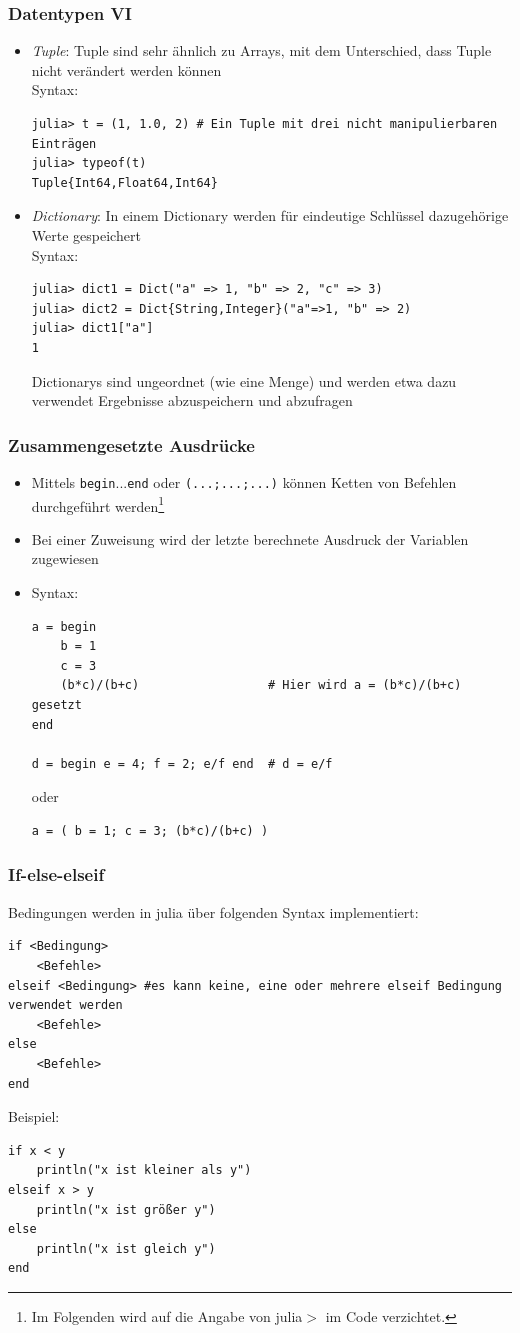 \begin{frame}[fragile]
\frametitle{Datentypen VI}
\begin{itemize}[<+->]
\item \textit{Tuple}: Tuple sind sehr ähnlich zu Arrays, mit dem Unterschied, dass Tuple nicht verändert werden können\\Syntax:
\begin{verbatim}
julia> t = (1, 1.0, 2) # Ein Tuple mit drei nicht manipulierbaren Einträgen
julia> typeof(t)
Tuple{Int64,Float64,Int64}
\end{verbatim}
\item \textit{Dictionary}: In einem Dictionary werden für eindeutige Schlüssel dazugehörige Werte gespeichert\\Syntax:
\begin{verbatim}
julia> dict1 = Dict("a" => 1, "b" => 2, "c" => 3)      
julia> dict2 = Dict{String,Integer}("a"=>1, "b" => 2)  
julia> dict1["a"]                                     
1
\end{verbatim}
Dictionarys sind ungeordnet (wie eine Menge) und werden etwa dazu verwendet Ergebnisse abzuspeichern und abzufragen
\end{itemize}
\end{frame}
\begin{frame}[fragile]
\frametitle{Zusammengesetzte Ausdrücke}
\begin{itemize}[<+->]
\item Mittels \verb+begin+...\verb+end+ oder \verb+(...;...;...)+ können Ketten von Befehlen durchgeführt werden\footnote{Im Folgenden wird auf die Angabe von \glqq julia$>$\grqq{} im Code verzichtet.}
\item Bei einer Zuweisung wird der letzte berechnete Ausdruck der Variablen zugewiesen
\item Syntax:
\begin{verbatim}
a = begin
    b = 1
    c = 3
    (b*c)/(b+c)                  # Hier wird a = (b*c)/(b+c) gesetzt
end

d = begin e = 4; f = 2; e/f end  # d = e/f
\end{verbatim}
oder
\begin{verbatim}
a = ( b = 1; c = 3; (b*c)/(b+c) )
\end{verbatim}
\end{itemize}
\end{frame}
\begin{frame}[fragile]
\frametitle{If-else-elseif}
Bedingungen werden in julia über folgenden Syntax implementiert:
\begin{verbatim}
if <Bedingung>
    <Befehle>
elseif <Bedingung> #es kann keine, eine oder mehrere elseif Bedingung verwendet werden
    <Befehle>
else
    <Befehle>
end
\end{verbatim}\pause
Beispiel:
\begin{verbatim}
if x < y
    println("x ist kleiner als y")
elseif x > y
    println("x ist größer y")
else
    println("x ist gleich y")
end
\end{verbatim}
\end{frame}
